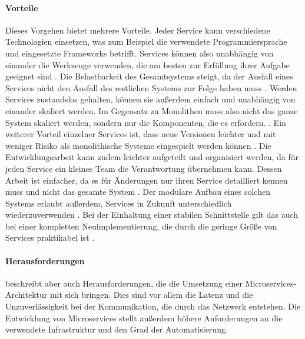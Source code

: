         \paragraph{Vorteile}
        Dieses Vorgehen bietet mehrere Vorteile.
        Jeder Service kann verschiedene Technologien einsetzen,
        was zum Beispiel die verwendete Programmiersprache und eingesetzte Frameworks betrifft.
        Services können also unabhängig von einander die Werkzeuge verwenden,
        die am besten zur Erfüllung ihrer Aufgabe geeignet sind
        \cite[Kapitel 1.2.1]{newman:microservices}.
        Die Belastbarkeit des Gesamtsystems steigt,
        da der Ausfall eines Services nicht den Ausfall des restlichen Systems
        zur Folge haben muss
        \cite[Kapitel 1.2.2]{newman:microservices}.
        Werden Services zustandslos gehalten,
        können sie außerdem einfach und unabhängig von einander skaliert werden.
        Im Gegensatz zu Monolithen muss also nicht das ganze System skaliert werden,
        sondern nur die Komponenten, die es erfordern.
        \cite[Kapitel 1.2.3]{newman:microservices}.
        Ein weiterer Vorteil einzelner Services ist,
        dass neue Versionen leichter und mit weniger Risiko als monolithische Systeme
        eingespielt werden können
        \cite[Kapitel 1.2.4]{newman:microservices}.
        Die Entwicklungsarbeit kann zudem leichter aufgeteilt und organisiert werden,
        da für jeden Service ein kleines Team die Verantwortung übernehmen kann.
        Dessen Arbeit ist einfacher, da es für Änderungen nur ihren Service detailliert kennen muss
        und nicht das gesamte System
        \cite[Kapitel 1.2.5]{newman:microservices}.
        Der modulare Aufbau eines solchen Systems erlaubt außerdem, Services
        in Zukunft unterschiedlich wiederzuverwenden
        \cite[Kapitel 1.2.6]{newman:microservices}.
        Bei der Einhaltung einer stabilen Schnittstelle gilt das auch bei einer
        kompletten Neuimplementierung, die durch die geringe Größe von
        Services praktikabel ist
        \cite[Kapitel 1.2.7]{newman:microservices}.       

        \paragraph{Herausforderungen}
        \citet[Kapitel 6.1-6.3]{wolff:microservices} beschreibt aber auch
        Herausforderungen, die die Umsetzung einer Microservices-Architektur mit sich bringen.
        Dies sind vor allem die Latenz und die Unzuverlässigkeit bei der Kommunikation,
        die durch das Netzwerk entstehen.
        Die Entwicklung von Microservices stellt außerdem höhere Anforderungen an die
        verwendete Infrastruktur und den Grad der Automatisierung.

